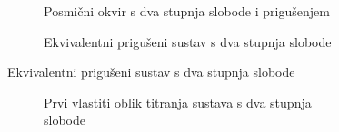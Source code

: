 \documentclass{article}
\begin{document}
\savebox{\imagebox}{}
\begin{figure}[H]
    \begin{subfigure}[b]{0.5\textwidth}
        \centering
        \usebox{\imagebox}
        \caption{Posmični okvir s dva stupnja slobode i prigušenjem}
    \end{subfigure}
    \hfill
    \begin{subfigure}[b]{0.5\textwidth}
        \centering
        
        \caption{Ekvivalentni prigušeni sustav s dva stupnja slobode}
    \end{subfigure}
\end{figure}

\begin{figure}[H]
    \begin{subfigure}[b]{0.5\textwidth}
        \centering
        
    \end{subfigure}
    \begin{subfigure}[b]{0.5\textwidth}
        \centering
        
    \end{subfigure}
\end{figure}

\begin{figure}[H]
    \begin{subfigure}[b]{0.5\textwidth}
        \centering
        
        \caption{Prvi vlastiti oblik titranja sustava s dva stupnja slobode}
    \end{subfigure}
    \hfill
    \begin{subfigure}[b]{0.5\textwidth}
        \centering
        
    \end{subfigure}
\end{figure}

\begin{figure}[H]
    
\end{figure}
\end{document}

